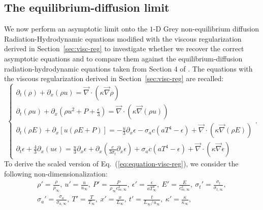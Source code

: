 \documentclass[review]{elsarticle}
\newcommand{\eqt}[1]{Eq.~(\ref{#1})}                     %
\newcommand{\sect}[1]{Section~\ref{#1}}                     %
\renewcommand{\div}{\vec{\nabla}\! \cdot \!}
\newcommand{\grad}{\vec{\nabla}}
\begin{document}
\subsection{The equilibrium-diffusion limit}\label{sect:equ-diff}
We now perform an asymptotic limit onto the $1$-D Grey non-equilibrium diffusion Radiation-Hydrodynamic equations modified with the viscous regularization derived in \sect{sec:visc-reg} to investigate whether we recover the correct asymptotic equations and to compare them against the equilibrium-diffusion radiation-hydrodynamic equations taken from Section $4$ of \cite{LowrieMorel}. The equations with the viscous regularization derived in \sect{sec:visc-reg} are recalled:
%
\begin{equation}
\label{eq:equation-visc-reg}
\left\{
\begin{array}{lll}
\partial_t \left( \rho \right) + \partial_x\left( \rho u \right) = \div \left( \kappa \grad \rho \right) \\
\partial_t \left( \rho u\right) + \partial_x \left(\rho u^2 + P + \frac{\epsilon}{3} \right) = \div \left( \kappa \grad (\rho u) \right) \\
\partial_t \left( \rho E\right) + \partial_x \left[ u \left( \rho E + P \right) \right] = -\frac{u}{3} \partial_x \epsilon - \sigma_a c \left( a T^4 - \epsilon \right) + \div \left( \kappa \grad (\rho E)\right)\\
\partial_t \epsilon + \frac{4}{3} \partial_x \left( u \epsilon \right) = \frac{u}{3} \partial_x \epsilon + \partial_x \left( \frac{c}{3 \sigma_t} \partial_x \epsilon \right) + \sigma_a c \left( a T^4 - \epsilon \right) + \div \left( \kappa \grad \epsilon \right)
\end{array}
\right. .
\end{equation}
%
To derive the scaled version of \eqt{eq:equation-visc-reg}, we consider the following non-dimensionalization:
%
\begin{multline}
\label{eq:norm_param}
\rho'   = \frac{\rho}{\rho_\infty}           ,\
u'      = \frac{u}{u_\infty}                 ,\
P'      = \frac{P}{\rho_\infty c^2_{m,\infty}}   ,\
\epsilon'      = \frac{\epsilon}{a T_\infty^4 }              ,\
E'      = \frac{E}{c^2_{m,\infty} }              ,\
\sigma_t'      = \frac{\sigma_t}{\sigma_{t,\infty} }              ,\\
\sigma_a'      = \frac{\sigma_a}{\sigma_{a,\infty} }              ,\
T'      = \frac{T}{T_\infty }              ,\
x' = \frac{x}{L_\infty}                      ,\
t' = \frac{t}{L_\infty / u_\infty}           ,\ 
\kappa' = \frac{\kappa}{\kappa_\infty}       ,
\end{multline}
\end{document}
